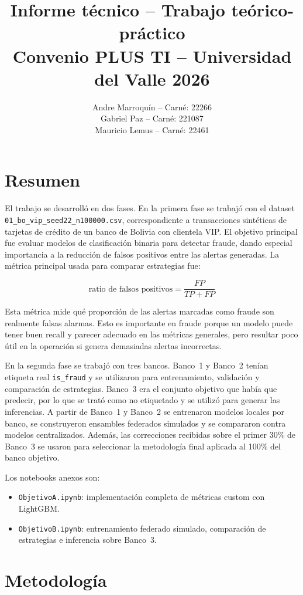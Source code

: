 \documentclass[10pt,a4paper]{article}
\title{\textbf{Informe técnico -- Trabajo teórico-práctico}\\
\large Convenio PLUS TI -- Universidad del Valle 2026}
\author{
Andre Marroquín -- Carné: 22266\\
Gabriel Paz -- Carné: 221087\\
Mauricio Lemus -- Carné: 22461
}
\date{}
\begin{document}
\maketitle

\section{Resumen}

El trabajo se desarrolló en dos fases. En la primera fase se trabajó con el dataset
\texttt{01\_bo\_vip\_seed22\_n100000.csv}, correspondiente a transacciones sintéticas de tarjetas
de crédito de un banco de Bolivia con clientela VIP. El objetivo principal fue evaluar modelos 
de clasificación binaria para detectar fraude, dando especial importancia a la reducción de 
falsos positivos entre las alertas generadas. La métrica principal usada para comparar estrategias fue:

\[
\text{ratio de falsos positivos} = \frac{FP}{TP + FP}
\]

Esta métrica mide qué proporción de las alertas marcadas como fraude son realmente falsas alarmas.
Esto es importante en fraude porque un modelo puede tener buen recall y parecer adecuado
en las métricas generales, pero resultar poco útil en la operación si genera demasiadas
alertas incorrectas.

En la segunda fase se trabajó con tres bancos. Banco~1 y Banco~2 tenían etiqueta real
\texttt{is\_fraud} y se utilizaron para entrenamiento, validación y comparación de estrategias.
Banco~3 era el conjunto objetivo que había que predecir, por lo que se
trató como no etiquetado y se utilizó para generar las inferencias. A partir de
Banco~1 y Banco~2 se entrenaron modelos locales por banco, se construyeron ensambles federados
simulados y se compararon contra modelos centralizados. Además, las correcciones recibidas sobre el primer 30\% de Banco~3 se usaron para seleccionar
la metodología final aplicada al 100\% del banco objetivo.

Los notebooks anexos son:

\begin{itemize}[leftmargin=*]
  \item \texttt{ObjetivoA.ipynb}: implementación completa de métricas custom con LightGBM.
  \item \texttt{ObjetivoB.ipynb}: entrenamiento federado simulado, comparación de estrategias
        e inferencia sobre Banco~3.
\end{itemize}

\section{Metodología}
\end{document}
